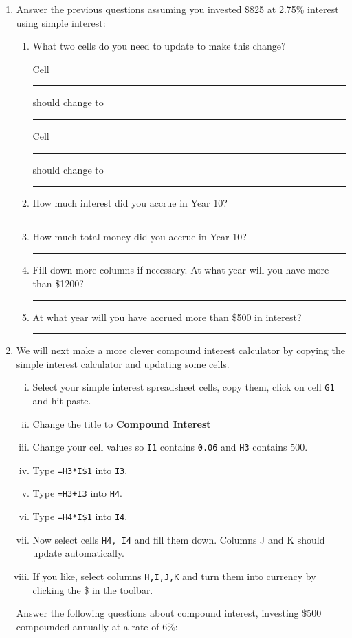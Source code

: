 \documentclass[12pt]{article}
\newcommand{\ans}[1][1in]{\rule{#1}{.5pt}}
\newcommand{\be}{\begin{enumerate}}
\newcommand{\ee}{\end{enumerate}}
\begin{document}
\begin{enumerate}
\singlespacing

\item Answer the previous questions assuming you invested \$825 at 2.75\% interest using simple interest:

\doublespacing

\be
\item What two cells do you need to update to make this change?

Cell  \ans should change to \ans

 Cell \ans should change to \ans


 

\item How much interest did you accrue in Year 10? \ans
\item How much total money did you accrue in Year 10? \ans
\item Fill down more columns if necessary. At what year will you have more than \$1200? \ans
\item At what year will you have accrued more than \$500 in interest? \ans

\ee


\newpage

\singlespacing
\item We will next make a more clever compound interest calculator by copying the simple interest calculator and updating some cells. 

\be[(i)]
\item Select your simple interest spreadsheet cells, copy them, click on cell \verb`G1` and hit paste.
\item Change the title to {\bf Compound Interest}
\item Change your cell values so  \verb`I1`  contains \verb`0.06` and \verb`H3`  contains 500.
\item Type \verb`=H3*I$1` into \verb`I3`. 
\item Type \verb`=H3+I3` into \verb`H4`.
\item Type \verb`=H4*I$1` into \verb`I4`.
\item Now select cells \verb`H4, I4` and fill them down. Columns J and K should update automatically.
\item If you like, select columns {\tt H,I,J,K} and turn them into currency by clicking the \$ in the toolbar.
\ee

Answer the following questions about compound interest, investing \$500 compounded annually at a rate of 6\%:




\end{enumerate}
\end{document}
